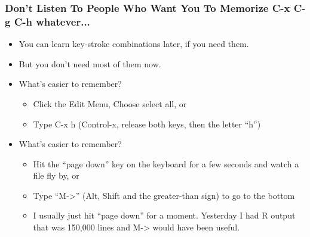 \documentclass[11pt,english]{beamer}
\begin{document}
\begin{frame}
  \frametitle{Don't Listen To People Who Want You To Memorize C-x C-g C-h whatever...}
  \begin{itemize}
  \item You can learn key-stroke combinations later, if you need them.
  \item But you don't need most of them now.
  \item What's easier to remember?

    \begin{itemize}
    \item Click the Edit Menu, Choose select all, or
    \item Type C-x h (Control-x, release both keys, then the letter ``h'')
    \end{itemize}
  \item What's easier to remember?

    \begin{itemize}
    \item Hit the ``page down'' key on the keyboard for a few seconds and
      watch a file fly by, or
    \item Type ``M->'' (Alt, Shift and the greater-than sign) to go to
      the bottom
    \item I usually just hit ``page down'' for a moment. Yesterday I
      had R output that was 150,000 lines and M-> would have been
      useful.
    \end{itemize}
  \end{itemize}
\end{frame}
\end{document}
